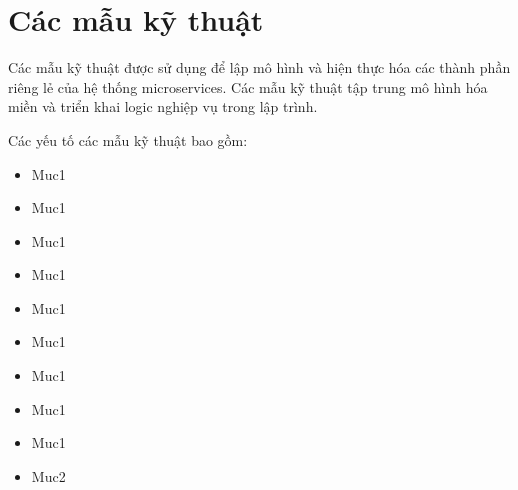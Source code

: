 

















\chapter{Các mẫu kỹ thuật}

Các mẫu kỹ thuật được sử dụng để lập mô hình và hiện thực hóa các thành phần riêng lẻ của hệ thống microservices. Các mẫu kỹ thuật tập trung mô hình hóa miền và triển khai logic nghiệp vụ trong lập trình.

Các yếu tố các mẫu kỹ thuật bao gồm:

\begin{itemize}

    \item Muc1

    \item Muc1

    \item Muc1

    \item Muc1

    \item Muc1

    \item Muc1

    \item Muc1

    \item Muc1

    \item Muc1

    \item Muc2

\end{itemize}

